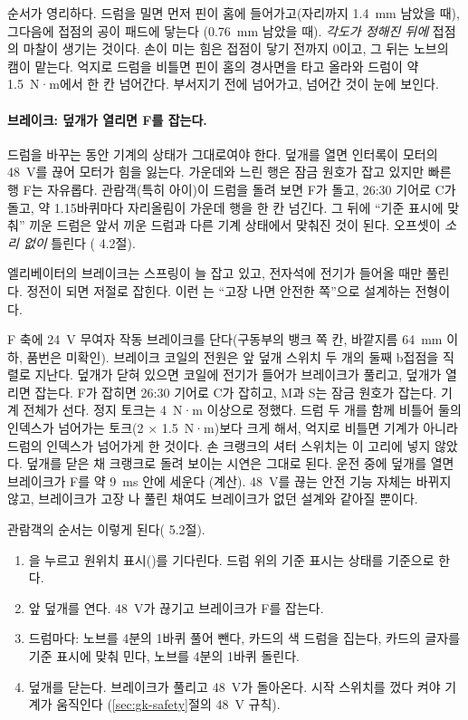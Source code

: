 순서가 영리하다. 드럼을 밀면 먼저 핀이 홈에 들어가고(자리까지 1.4~mm 남았을 때), 그다음에 접점의 공이 패드에 닿는다
(0.76~mm 남았을 때). \emph{각도가 정해진 뒤에} 접점의 마찰이 생기는 것이다. 손이 미는 힘은 접점이 닿기 전까지 0이고,
그 뒤는 노브의 캠이 맡는다. 억지로 드럼을 비틀면 핀이 홈의 경사면을 타고 올라와 드럼이 약 1.5~N·m에서 한 칸 넘어간다.
부서지기 전에 넘어가고, 넘어간 것이 눈에 보인다.

\paragraph{브레이크: 덮개가 열리면 F를 잡는다.} 드럼을 바꾸는 동안 기계의 상태가 그대로여야 한다. 덮개를 열면 인터록이
모터의 48~V를 끊어 모터가 힘을 잃는다. 가운데와 느린 행은 잠금 원호가 잡고 있지만 빠른 행 F는 자유롭다. 관람객(특히
아이)이 드럼을 돌려 보면 F가 돌고, 26:30 기어로 C가 돌고, 약 1.15바퀴마다 자리올림이 가운데 행을 한 칸 넘긴다. 그 뒤에
``기준 표시에 맞춰'' 끼운 드럼은 앞서 끼운 드럼과 다른 기계 상태에서 맞춰진 것이 된다. 오프셋이 \emph{소리 없이} 틀린다
( 4.2절).

\General 엘리베이터의 브레이크는 스프링이 늘 잡고 있고, 전자석에 전기가 들어올 때만 풀린다. 정전이 되면 저절로 잡힌다.
이런 는 ``고장 나면 안전한 쪽''으로 설계하는 전형이다.

\Ours F 축에 24~V 무여자 작동 브레이크를 단다(구동부의 뱅크 쪽 칸, 바깥지름 64~mm 이하, 품번은 미확인). 브레이크
코일의 전원은 앞 덮개 스위치 두 개의 둘째 b접점을 직렬로 지난다. 덮개가 닫혀 있으면 코일에 전기가 들어가 브레이크가
풀리고, 덮개가 열리면 잡는다. F가 잡히면 26:30 기어로 C가 잡히고, M과 S는 잠금 원호가 잡는다. 기계 전체가 선다.
정지 토크는 4~N·m 이상으로 정했다. 드럼 두 개를 함께 비틀어 둘의 인덱스가 넘어가는 토크(2 × 1.5~N·m)보다 크게 해서,
억지로 비틀면 기계가 아니라 드럼의 인덱스가 넘어가게 한 것이다. 손 크랭크의 셔터 스위치는 이 고리에 넣지 않았다.
덮개를 닫은 채 크랭크로 돌려 보이는 시연은 그대로 된다. 운전 중에 덮개를 열면 브레이크가 F를 약 9~ms 안에 세운다
(계산). 48~V를 끊는 안전 기능 자체는 바뀌지 않고, 브레이크가 고장 나 풀린 채여도 브레이크가 없던 설계와 같아질
뿐이다.

관람객의 순서는 이렇게 된다( 5.2절).
\begin{enumerate}
\item {}을 누르고 원위치 표시()를 기다린다. 드럼 위의 기준 표시는  상태를 기준으로 한다.
\item 앞 덮개를 연다. 48~V가 끊기고 브레이크가 F를 잡는다.
\item 드럼마다: 노브를 4분의 1바퀴 풀어 뺀다, 카드의 색 드럼을 집는다, 카드의 글자를 기준 표시에 맞춰 민다, 노브를
4분의 1바퀴 돌린다.
\item 덮개를 닫는다. 브레이크가 풀리고 48~V가 돌아온다. 시작 스위치를 껐다 켜야 기계가 움직인다
(\ref{sec:gk-safety}절의 48~V 규칙).
\end{enumerate}

